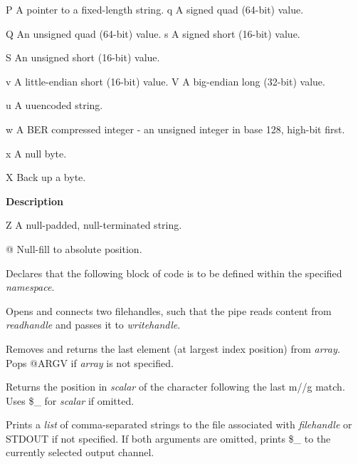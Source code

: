 \documentclass[a4paper,11pt]{book}
\begin{document}
\noindent 

\noindent P A pointer to a fixed-length string. q A signed quad (64-bit) value.

\noindent Q An unsigned quad (64-bit) value. s A signed short (16-bit) value.

\noindent S An unsigned short (16-bit) value.

\noindent 

\noindent v A little-endian short (16-bit) value. V A big-endian long (32-bit) value.

\noindent u A uuencoded string.

\noindent 

\noindent w A BER compressed integer - an unsigned integer in base 128, high-bit first.

\noindent 

\noindent x A null byte.

\noindent 

\noindent X Back up a byte.

\noindent 

\noindent 

\noindent \textbf{Description}

\noindent 

\noindent Z A null-padded, null-terminated string.

\noindent 

\noindent @ Null-fill to absolute position.

\noindent 

\noindent Declares that the following block of code is to be defined within the specified \textit{namespace}.

\noindent 

\noindent Opens and connects two filehandles, such that the pipe reads content from \textit{readhandle }and passes it to \textit{writehandle}.

\noindent 

\noindent Removes and returns the last element (at largest index position) from \textit{array. }Pops @ARGV if \textit{array }is not specified.

\noindent 

\noindent Returns the position in \textit{scalar }of the character following the last m//g match. Uses \$\_ for \textit{scalar }if omitted.

\noindent 

\noindent Prints a \textit{list }of comma-separated strings to the file associated with \textit{filehandle }or STDOUT if not specified. If both arguments are omitted, prints \$\_ to the currently selected output channel.
\end{document}
